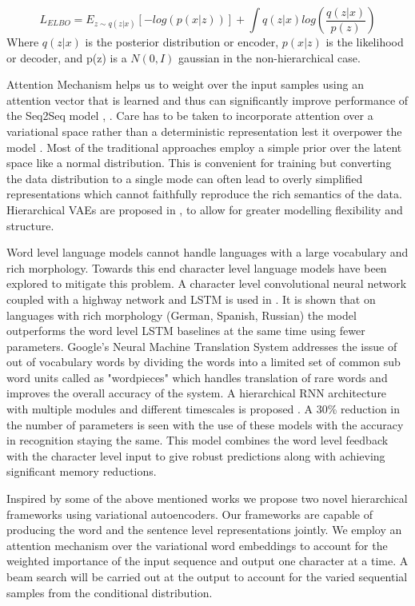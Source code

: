 \documentclass[journal, 12pt, draftcls, onecolumn]{IEEEtran}
\begin{document}
\[L_{ELBO}= E_{z \sim q(z|x)}[-log(p(x|z))] +  \int q(z|x)log(\dfrac{q(z|x)}{p(z)}) \]
Where $q(z|x)$ is the posterior distribution or encoder, $p(x|z)$ is the likelihood or decoder, and p(z) is a $N(0,I)$ gaussian in the non-hierarchical case.

Attention Mechanism helps us to weight over the input samples using an attention vector that is learned and thus can significantly improve performance of the Seq2Seq model \cite{C2}, \cite{C10}. Care has to be taken to incorporate attention over a variational space rather than a deterministic representation lest it overpower the model \cite{C11}.
Most of the traditional approaches employ a simple prior over the latent space like a normal distribution. This is convenient for training but converting the data distribution to a single mode can often lead to overly simplified representations which cannot faithfully reproduce the rich semantics of the data. Hierarchical VAEs are proposed in \cite{C12}, \cite{C13} to allow for greater modelling flexibility and structure.   

Word level language models cannot handle languages with a large vocabulary and rich morphology. Towards this end character level language models have been explored to mitigate this problem. A character level convolutional neural network coupled with a highway network and LSTM is used in \cite{C16}. It is shown that on languages with rich morphology (German, Spanish, Russian) the model outperforms the word level LSTM baselines at the same time using fewer parameters. Google's Neural Machine Translation System \cite{C15} addresses the issue of out of vocabulary words by dividing the words into a limited set of common sub word units called as "wordpieces" which handles translation of rare words and improves the overall accuracy of the system. A hierarchical RNN architecture with multiple modules and different timescales is proposed \cite{C14}. A 30\% reduction in the number of parameters is seen with the use of these models with the accuracy in recognition staying the same. This model combines the word level feedback with the character level input to give robust predictions along with achieving significant memory reductions. 

Inspired by some of the above mentioned works we propose two novel hierarchical frameworks using variational autoencoders. Our frameworks are capable of producing the word and the sentence level representations jointly. We employ an attention mechanism over the variational word embeddings to account for the weighted importance of the input sequence and output one character at a time. A beam search will be carried out at the output to account for the varied sequential samples from the conditional distribution.  
\end{document}

